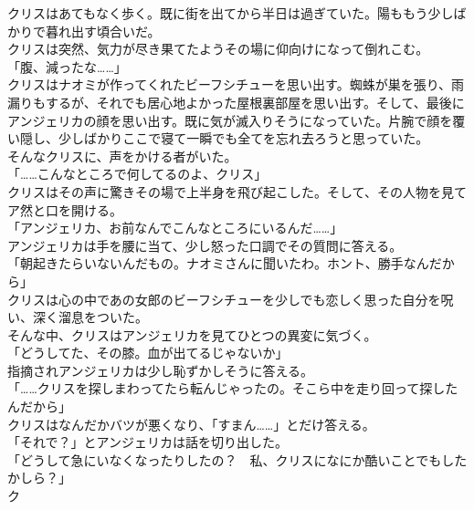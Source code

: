 \documentclass[b5j,10pt,openany]{jsbook}
\begin{document}
クリスはあてもなく歩く。既に街を出てから半日は過ぎていた。陽ももう少しばかりで暮れ出す頃合いだ。\\クリスは突然、気力が尽き果てたようその場に仰向けになって倒れこむ。\\「腹、減ったな\ldots{}\ldots{}」\\クリスはナオミが作ってくれたビーフシチューを思い出す。蜘蛛が巣を張り、雨漏りもするが、それでも居心地よかった屋根裏部屋を思い出す。そして、最後にアンジェリカの顔を思い出す。既に気が滅入りそうになっていた。片腕で顔を覆い隠し、少しばかりここで寝て一瞬でも全てを忘れ去ろうと思っていた。\\そんなクリスに、声をかける者がいた。\\「\ldots{}\ldots{}こんなところで何してるのよ、クリス」\\クリスはその声に驚きその場で上半身を飛び起こした。そして、その人物を見てア然と口を開ける。\\「アンジェリカ、お前なんでこんなところにいるんだ\ldots{}\ldots{}」\\アンジェリカは手を腰に当て、少し怒った口調でその質問に答える。\\「朝起きたらいないんだもの。ナオミさんに聞いたわ。ホント、勝手なんだから」\\クリスは心の中であの女郎のビーフシチューを少しでも恋しく思った自分を呪い、深く溜息をついた。\\そんな中、クリスはアンジェリカを見てひとつの異変に気づく。\\「どうしてた、その膝。血が出てるじゃないか」\\指摘されアンジェリカは少し恥ずかしそうに答える。\\「\ldots{}\ldots{}クリスを探しまわってたら転んじゃったの。そこら中を走り回って探したんだから」\\クリスはなんだかバツが悪くなり、「すまん\ldots{}\ldots{}」とだけ答える。\\「それで？」とアンジェリカは話を切り出した。\\「どうして急にいなくなったりしたの？　私、クリスになにか酷いことでもしたかしら？」\\ク
\end{document}

